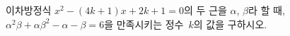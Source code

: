 이차방정식 $x^2-(4k+1)x+2k+1=0$의 두 근을 $\alpha$, $\beta$라 할 때, $\alpha^2\beta+\alpha\beta^2-\alpha-\beta=6$을 만족시키는 정수~$k$의 값을 구하시오.
